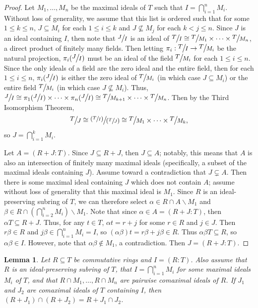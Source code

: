 \documentclass[12pt]{amsart}
\newtheorem{lemma}[theorem]{Lemma}
\theoremstyle{definition}
\newcommand{\quot}[2]{\large\sfrac{#1}{#2}\normalsize}
\begin{document}
\begin{proof}
    Let $M_1,\dots, M_n$ be the maximal ideals of $T$ such that $I=\bigcap_{i=1}^n M_i$. Without loss of generality, we assume that this list is ordered such that for some $1\leq k\leq n$, $J\subseteq M_i$ for each $1\leq i\leq k$ and $J\nsubseteq M_j$ for each $k<j\leq n$. Since $J$ is an ideal containing $I$, then note that $\quot{J}{I}$ is an ideal of $\quot{T}{I}\cong \quot{T}{M_1}\times\dots\times\quot{T}{M_n}$, a direct product of finitely many fields. Then letting $\pi_i:\quot{T}{I}\to\quot{T}{M_i}$ be the natural projection, $\pi_i(\quot{J}{I})$ must be an ideal of the field $\quot{T}{M_i}$ for each $1\leq i\leq n$. Since the only ideals of a field are the zero ideal and the entire field, then for each $1\leq i\leq n$, $\pi_i(\quot{J}{I})$ is either the zero ideal of $\quot{T}{M_i}$ (in which case $J\subseteq M_i$) or the entire field $\quot{T}{M_i}$ (in which case $J\nsubseteq M_i$). Thus, $\quot{J}{I}\cong \pi_1(\quot{J}{I})\times\dots\times \pi_n(\quot{J}{I})\cong \quot{T}{M_{k+1}}\times\dots\times\quot{T}{M_n}$. Then by the Third Isomorphism Theorem,
    $$\quot{T}{J}\cong\quot{(\sfrac{T}{I})}{(\sfrac{T}{J})}\cong \quot{T}{M_1}\times\dots\times \quot{T}{M_k},$$ so $J=\bigcap_{i=1}^k M_i$.

    Let $A=(R+J:T)$. Since $J\subseteq R+J$, then $J\subseteq A$; notably, this means that $A$ is also an intersection of finitely many maximal ideals (specifically, a subset of the maximal ideals containing $J$). Assume toward a contradiction that $J\subsetneq A$. Then there is some maximal ideal containing $J$ which does not contain $A$; assume without loss of generality that this maximal ideal is $M_1$. Since $R$ is an ideal-preserving subring of $T$, we can therefore select $\alpha\in R\cap A\backslash M_1$ and $\beta\in R\cap (\bigcap_{i=2}^{n}M_i)\backslash M_1$. Note that since $\alpha\in A=(R+J:T)$, then $\alpha T\subseteq R+J$. Thus, for any $t\in T$, $\alpha t=r+j$ for some $r\in R$ and $j\in J$. Then $r\beta\in R$ and $j\beta\in \bigcap_{i=1}^nM_i=I$, so $(\alpha\beta)t=r\beta+j\beta\in R$. Thus $\alpha\beta T\subseteq R$, so $\alpha\beta\in I$. However, note that $\alpha\beta\notin M_1$, a contradiction. Then $J=(R+J:T)$.
\end{proof}

\begin{lemma}
    \label{intersection of intermediate subrings}
    Let $R\subseteq T$ be commutative rings and $I=(R:T)$. Also assume that $R$ is an ideal-preserving subring of $T$, that $I=\bigcap_{i=1}^n M_i$ for some maximal ideals $M_i$ of $T$, and that $R\cap M_1,\dots,R\cap M_n$ are pairwise comaximal ideals of $R$. If $J_1$ and $J_2$ are comaximal ideals of $T$ containing $I$, then $(R+J_1)\cap (R+J_2)=R+J_1\cap J_2$.
\end{lemma}
\end{document}
